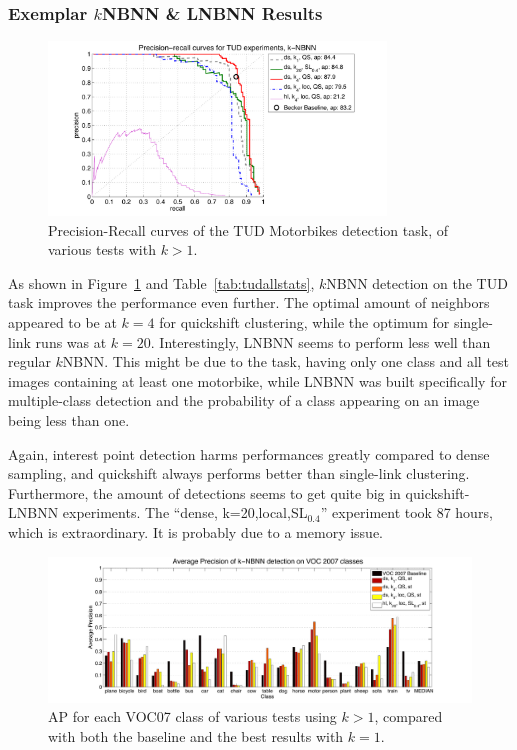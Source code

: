 
\subsubsection{Exemplar $k$NBNN \& LNBNN Results} %
\label{ssub:lnbnn_results}

\begin{figure}[hbt]
    \centering
    \includegraphics[width=0.8\textwidth]{TUDklocprc}
    \caption{Precision-Recall curves of the TUD Motorbikes detection task, of various tests with $k>1$.}
    \label{fig:tudklocprc}
\end{figure}



As shown in Figure~\ref{fig:tudklocprc} and Table~\ref{tab:tudallstats}, $k$NBNN detection on the TUD task improves the performance even further. The optimal amount of neighbors appeared to be at $k=4$ for quickshift clustering, while the optimum for single-link runs was at $k=20$. Interestingly, LNBNN seems to perform less well than regular $k$NBNN. This might be due to the task, having only one class and all test images containing at least one motorbike, while LNBNN was built specifically for multiple-class detection and the probability of a class appearing on an image being less than one.

Again, interest point detection harms performances greatly compared to dense sampling, and quickshift always performs better than single-link clustering. Furthermore, the amount of detections seems to get quite big in quickshift-LNBNN experiments. The ``dense, k=20,local,SL$_{0.4}$'' experiment took 87 hours, which is extraordinary. It is probably due to a memory issue.

\begin{figure}[hbt]
    \centering
    \includegraphics[width=\textwidth]{VOCklocap}
    \caption{AP for each VOC07 class of various tests using $k>1$, compared with both the baseline and the best results with $k=1$.}
    \label{fig:vocklocap}
\end{figure}

